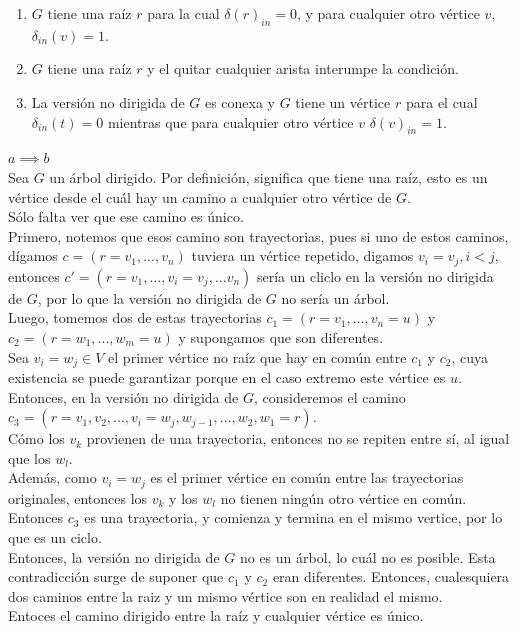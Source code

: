 \documentclass[12pt,a4paper]{report}
\begin{document}
\begin{enumerate}
{\begin{enumerate} [label = \alph*)]
				\item{
					$G$ tiene una raíz $r$ para la cual $\delta(r)_{in} = 0$, y para cualquier
					otro vértice $v$, $\delta_{in}(v) = 1$.\\
				}

				\item{
					$G$ tiene una raíz $r$ y el quitar cualquier arista interumpe la
					condición.\\
				}
				\item{
					La versión no dirigida de $G$ es conexa y $G$ tiene un vértice $r$ para
					el cual $\delta_{in}(t) = 0$ mientras que para cualquier otro vértice
					$v$ $\delta(v)_{in} = 1$.\\
				}
			\end{enumerate}

			$a \implies b$\\
			Sea $G$ un árbol dirigido. Por definición, significa que tiene una raíz,
			esto es un vértice desde el cuál hay un camino a cualquier otro vértice de
			$G$.\\
			Sólo falta ver que ese camino es único.\\

			Primero, notemos que esos camino son trayectorias, pues si uno de estos
			caminos, dígamos $c = (r = v_1, ..., v_n)$ tuviera un vértice repetido,
			digamos $v_i = v_j, i < j$, entonces $c' = (r = v_1, ..., v_i = v_j, ... v_n)$
			sería un cliclo en la versión no dirigida de $G$, por lo que la versión
			no dirigida de $G$ no sería un árbol.\\

			Luego, tomemos dos de estas trayectorias $c_1 = (r = v_1, ..., v_n = u)$ y
			$c_2 = (r = w_1, ..., w_m = u)$ y supongamos que son diferentes.\\
			Sea $v_i = w_j \in V$ el primer vértice no raíz que hay en común entre
			$c_1$ y $c_2$, cuya existencia se puede garantizar porque en el caso
			extremo este vértice es $u$.\\
			Entonces, en la versión no dirigida de $G$, consideremos el camino
			$c_3 = (r = v_1, v_2, ..., v_i = w_j, w_{j-1}, ..., w_2, w_1 = r)$.\\
			Cómo los $v_k$ provienen de una trayectoria, entonces no se repiten entre
			sí, al igual que los $w_l$.\\
			Además, como $v_i = w_j$ es el primer vértice en común entre las
			trayectorias originales, entonces los $v_k$ y  los $w_l$ no tienen ningún
			otro vértice en común.
			Entonces $c_3$ es una trayectoria, y comienza  y termina en el mismo
			vertice, por lo que es un ciclo.\\
			Entonces, la versión no dirigida de $G$ no es un árbol, lo cuál no es
			posible. Esta contradicción surge de suponer que $c_1$ y $c_2$ eran
			diferentes. Entonces, cualesquiera dos caminos entre la raiz y un mismo
			vértice son en realidad el mismo.\\
			Entoces el camino dirigido entre la raíz y cualquier vértice es único.\\

}
\end{enumerate}
\end{document}
